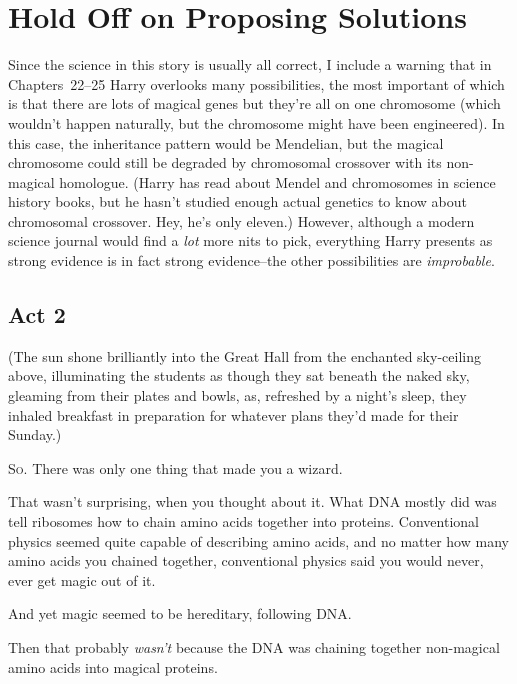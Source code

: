 \chapter{Hold Off on Proposing Solutions}

\begin{chapterOpeningAuthorNote}
Since the science in this story is usually all correct, I include a warning that in Chapters~22--25 Harry overlooks many possibilities, the most important of which is that there are lots of magical genes but they're all on one chromosome (which wouldn't happen naturally, but the chromosome might have been engineered). In this case, the inheritance pattern would be Mendelian, but the magical chromosome could still be degraded by chromosomal crossover with its non-magical homologue. (Harry has read about Mendel and chromosomes in science history books, but he hasn't studied enough actual genetics to know about chromosomal crossover. Hey, he's only eleven.) However, although a modern science journal would find a \emph{lot} more nits to pick, everything Harry presents as strong evidence is in fact strong evidence\---the other possibilities are \emph{improbable}.
\end{chapterOpeningAuthorNote}

\section{Act 2}

(The sun shone brilliantly into the Great Hall from the enchanted sky-ceiling above, illuminating the students as though they sat beneath the naked sky, gleaming from their plates and bowls, as, refreshed by a night's sleep, they inhaled breakfast in preparation for whatever plans they'd made for their Sunday.)

\vspace{2ex}
\lettrine{S}{o.} There was only one thing that made you a wizard.

That wasn't surprising, when you thought about it. What DNA mostly did was tell ribosomes how to chain amino acids together into proteins. Conventional physics seemed quite capable of describing amino acids, and no matter how many amino acids you chained together, conventional physics said you would never, ever get magic out of it.

And yet magic seemed to be hereditary, following DNA.

Then that probably \emph{wasn't} because the DNA was chaining together non-magical amino acids into magical proteins.

